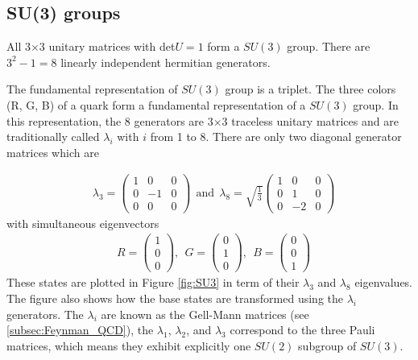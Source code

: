 \subsection{SU(3) groups}\label{subsec:SU3_groups}
All 3$\times$3 unitary matrices with det$U=1$ form a $SU(3)$ group. There are $3^{2}-1=8$ linearly independent hermitian generators.

The fundamental representation of $SU(3)$ group is a triplet. The three colors (R, G, B) of a quark form a fundamental representation of a $SU(3)$ group. In this representation, the 8 generators are 3$\times$3 traceless unitary matrices and are traditionally called $\lambda_i$ with $i$ from 1 to 8. There are only two diagonal generator matrices which are

\begin{equation}
\begin{split}
&\lambda_3=\begin{pmatrix}  1&0&0\\0&-1&0\\0&0&0 \end{pmatrix}~~\mathrm{and}~~\lambda_8=\sqrt{\frac{1}{3}}\begin{pmatrix}  1&0&0\\0&1&0\\0&-2&0 \end{pmatrix}
\end{split}
\label{eq:lam3_8}
\end{equation}
with simultaneous eigenvectors  
\begin{equation}
\begin{split}
&R=\begin{pmatrix}  1\\0\\0\end{pmatrix},~~G=\begin{pmatrix}  0\\1\\0\end{pmatrix},~~B=\begin{pmatrix}  0\\0\\1\end{pmatrix}
\end{split}
\label{eq:RGB}
\end{equation}
These states are plotted in Figure \ref{fig:SU3} in term of their $\lambda_3$ and $\lambda_8$ eigenvalues. The figure also shows how the base states are transformed using the $\lambda_i$ generators. The $\lambda_i$ are known as the Gell-Mann matrices (see \ref{subsec:Feynman_QCD}), the $\lambda_1$, $\lambda_2$, and $\lambda_3$ correspond to the three Pauli matrices, which means they exhibit explicitly one $SU(2)$ subgroup of $SU(3)$.

